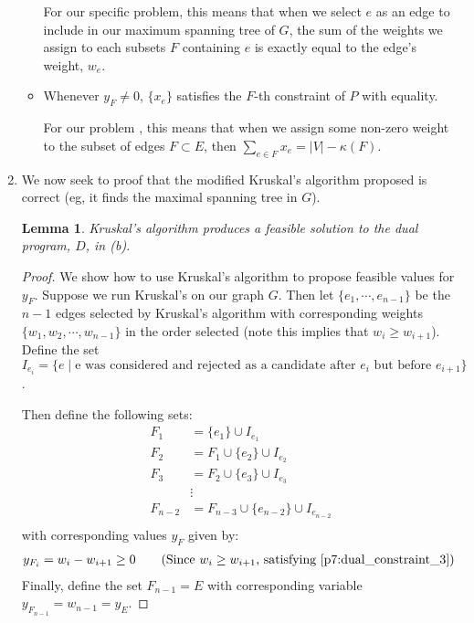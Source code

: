 \documentclass[12pt]{exam}
\newtheorem{lemma}[theorem]{Lemma}
\begin{document}
\begin{questions}
\begin{solution}
\begin{enumerate}[label=(\alph*)]
\begin{itemize}
            For our specific problem, this means that when we select $e$ as an edge to include in our maximum spanning tree of $G$, the sum of the weights we assign to each subsets $F$ containing $e$ is exactly equal to the edge's weight, $w_e$.

          \item Whenever $y_F \neq 0$, $\{x_e\}$ satisfies the $F$-th constraint of $P$ with equality.

            For our problem , this means that when we assign some non-zero weight to the subset of edges $F \subset E$, then $\sum_{e \in F} x_e = |V| - \kappa(F)$. 
        \end{itemize}
    \item
      We now seek to proof that the modified Kruskal's algorithm proposed is correct (eg, it finds the maximal spanning tree in $G$).

      \begin{lemma}
        Kruskal's algorithm produces a feasible solution to the dual program, $D$, in (b).
      \end{lemma}
      \begin{proof}
        We show how to use Kruskal's algorithm to propose feasible values for $y_F$. Suppose we run Kruskal's on our graph $G$. Then let $\{e_1, \cdots, e_{n-1}\}$ be the $n-1$ edges selected by Kruskal's algorithm with corresponding weights $\{w_1, w_2, \cdots, w_{n-1}\}$ in the order selected (note this implies that $w_i \geq w_{i+1}$). Define the set $I_{e_i} = \{ e \mid \text{e was considered and rejected as a candidate after } e_i \text{ but before } e_{i + 1}\}$.

        Then define the following sets:
        \begin{align*}
          F_1 &= \{e_1\} \cup I_{e_1} \\
          F_2 &= F_1 \cup \{ e_2 \} \cup I_{e_2} \\
          F_3 &= F_2 \cup \{ e_3 \} \cup I_{e_3}\\
          & \vdots  \\
          F_{n-2} &= F_{n-3} \cup \{e_{n-2}\} \cup I_{e_{n-2}} \\
        \end{align*}
        with corresponding values $y_{F}$ given by:
        \begin{align*}
          y_{F_i} &= w_i - w_{i+1} \geq 0 \tag{Since $w_i \geq w_{i+1}$, satisfying \ref{p7:dual_constraint_3}}
        \end{align*}
        Finally, define the set $F_{n-1} = E$ with corresponding variable $y_{F_{n-1}} = w_{n-1} = y_E$.


\end{proof}
\end{enumerate}
\end{solution}
\end{questions}
\end{document}
